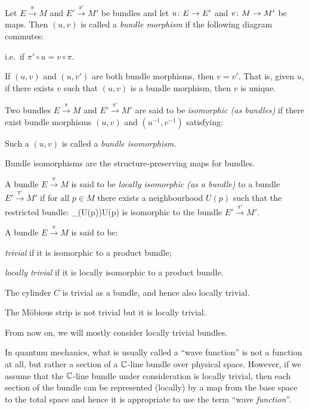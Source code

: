 \bd
Let $E\xrightarrow{\,\pi\,}M$ and $E'\xrightarrow{\,\pi'\,}M'$ be bundles and let $u\colon E\to E'$ and $v\colon M\to M'$ be maps. Then $(u,v)$ is called a \emph{bundle morphism} if the following diagram commutes:
\bse
{}
\ese
i.e.\ if $\pi'\circ u = v \circ \pi$.
\ed

If $(u,v)$ and $(u,v')$ are both bundle morphisms, then $v=v'$. That is, given $u$, if there exists $v$ such that $(u,v)$ is a bundle morphism, then $v$ is unique.

\bd
Two bundles $E\xrightarrow{\,\pi\,}M$ and $E'\xrightarrow{\,\pi'\,}M'$ are said to be \emph{isomorphic (as bundles)} if there exist bundle morphisms $(u,v)$ and $(u^{-1},v^{-1})$ satisfying:
\bse
{}
\ese
Such a $(u,v)$ is called a \emph{bundle isomorphism}.
\ed

Bundle isomorphisms are the structure-preserving maps for bundles.

\bd
A bundle $E\xrightarrow{\,\pi\,}M$ is said to be \emph{locally isomorphic (as a bundle)} to a bundle $E'\xrightarrow{\,\pi'\,}M'$ if for all $p\in M$ there exists a neighbourhood $U(p)$ such that the restricted bundle:
\bse
{}_\pi(U(p))U(p)
\ese
is isomorphic to the bundle $E'\xrightarrow{\,\pi'\,}M'$.
\ed

\bd
A bundle $E\xrightarrow{\,\pi\,}M$ is said to be:
\ben
\item[i)] \emph{trivial} if it is isomorphic to a product bundle;
\item[ii)] \emph{locally trivial} if it is locally isomorphic to a product bundle.
\een
\ed

\be
The cylinder $C$ is trivial as a bundle, and hence also locally trivial.
\ee

\be
The M\"obious strip is not trivial but it is locally trivial.
\ee

From now on, we will mostly consider locally trivial bundles.

\br
In quantum mechanics, what is usually called a ``wave function'' is not a function at all, but rather a section of a $\mathbb{C}$-line bundle over physical space. However, if we assume that the $\mathbb{C}$-line bundle under consideration is locally trivial, then each section of the bundle can be represented (locally) by a map from the base space to the total space and hence it is appropriate to use the term ``wave \emph{function}''. 
\er

